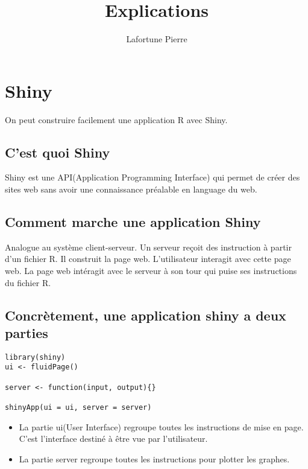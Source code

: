 \documentclass[a4paper]{article}
\author{Lafortune Pierre}
\date{}
\title{Explications}
\begin{document}
\maketitle
\newpage

\tableofcontents

\newpage 

\section{Shiny}
\label{sec:org7f68c11}
On peut construire facilement une application R avec Shiny. 

\subsection{C'est quoi Shiny}
\label{sec:orgcea676d}
Shiny est une API(Application Programming Interface) qui permet de créer des sites web sans avoir une connaissance préalable
en language du web. 

\subsection{Comment marche une application Shiny}
\label{sec:org07d942b}
Analogue au système client-serveur. Un serveur reçoit des instruction à partir d'un fichier R. Il construit la page web. L'utilisateur
interagit avec cette page web. La page web intéragit avec le serveur à son tour qui puise ses instructions du fichier R.

\subsection{Concrètement, une application shiny a deux parties}
\label{sec:org37f3a32}
\begin{verbatim}
library(shiny)
ui <- fluidPage()

server <- function(input, output){}

shinyApp(ui = ui, server = server)
\end{verbatim}

\begin{itemize}
\item La partie ui(User Interface) regroupe toutes les instructions de mise en page. C'est l'interface destiné à être vue par l'utilisateur.
\item La partie server regroupe toutes les instructions pour plotter les graphes.
\end{itemize}
\end{document}
